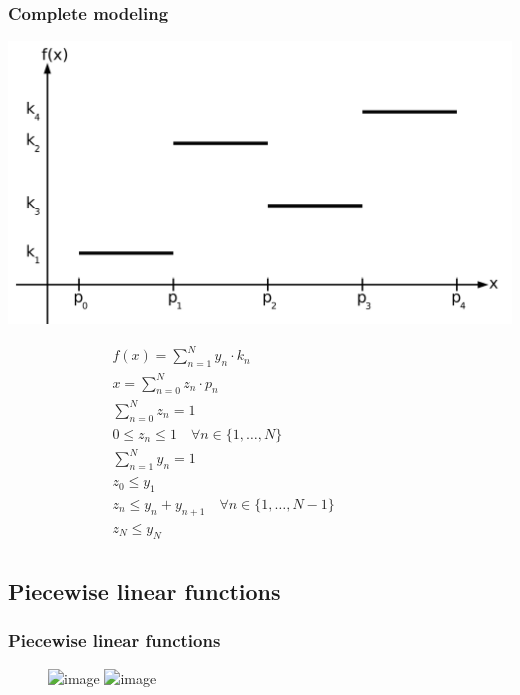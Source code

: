 \begin{frame}
 \frametitle{Complete modeling}
 \begin{flushright}
  \includegraphics[width=.5\textwidth,page=3]{Bilder/Treppenfunktion}
 \end{flushright}
 \vspace{-15ex}\small
 \begin{align*}
  &f(x) = \sum_{n=1}^N y_n\cdot k_n\\
  &x = \sum_{n=0}^{N} z_n\cdot p_n\\
  &\sum_{n=0}^N z_n = 1\\
  &0 \leq z_n \leq 1\quad\forall n\in\{1, \ldots, N\}\\
  &\sum_{n=1}^{N}{y_n} = 1\\
  &z_0 \leq y_1\\
  &z_n \leq y_n + y_{n+1}\quad\forall n\in\{1, \ldots, N-1\}\qquad\qquad\qquad\mbox{}\\
  &z_N \leq y_N\\
 \end{align*}
\end{frame}


\subsection{Piecewise linear functions}
\begin{frame}
 \frametitle{Piecewise linear functions}
 \begin{figure}
  \centering
  \includegraphics<1>[width=\linewidth,page=1]{Bilder/StueckweiseLineareFunktion1}
  \includegraphics<2>[width=\linewidth,page=2]{Bilder/StueckweiseLineareFunktion1}
 \end{figure}
\end{frame}


